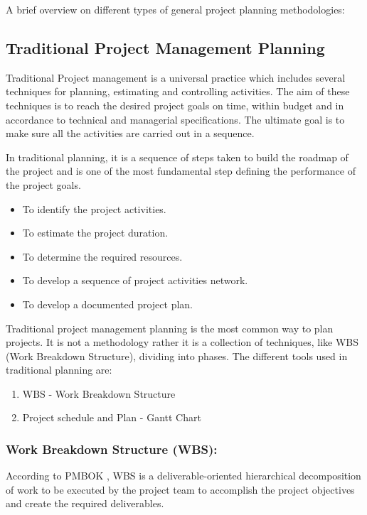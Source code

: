A brief overview on different types of general project planning methodologies:

\subsection{Traditional Project Management Planning}

Traditional Project management is a universal practice which includes several techniques for planning, estimating and controlling activities. The aim of these techniques is to reach the desired project goals on time, within budget and in accordance to technical and managerial specifications. The ultimate goal is to make sure all the activities are carried out in a sequence.

In traditional planning, it is a sequence of steps taken to build the roadmap of the project and is one of the most fundamental step defining the performance of the project goals.

\begin{itemize}
    \item To identify the project activities. 
    \item To estimate the project duration.
    \item To determine the required resources. 
    \item To develop a sequence of project activities network. 
    \item To develop a documented project plan.
\end{itemize}

Traditional project management planning is the most common way to plan projects. It is not a methodology rather it is a collection of techniques, like WBS (Work Breakdown Structure), dividing into phases. The different tools used in traditional planning are:
\begin{enumerate}
    \item WBS - Work Breakdown Structure
    \item Project schedule and Plan - Gantt Chart 
\end{enumerate}

\subsubsection{ \textbf{Work Breakdown Structure (WBS):} }
 According to PMBOK \cite{PMBOK2013}, WBS is a deliverable-oriented hierarchical decomposition of work to be executed by the project team to accomplish the project objectives and create the required deliverables.

